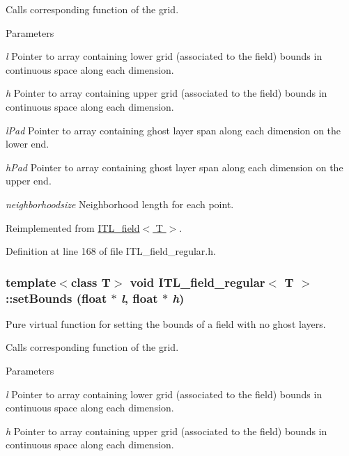 Calls corresponding function of the grid. 
\begin{DoxyParams}{Parameters}
\item[{\em l}]Pointer to array containing lower grid (associated to the field) bounds in continuous space along each dimension. \item[{\em h}]Pointer to array containing upper grid (associated to the field) bounds in continuous space along each dimension. \item[{\em lPad}]Pointer to array containing ghost layer span along each dimension on the lower end. \item[{\em hPad}]Pointer to array containing ghost layer span along each dimension on the upper end. \item[{\em neighborhoodsize}]Neighborhood length for each point. \end{DoxyParams}


Reimplemented from \hyperlink{classITL__field_ab27b49b81f3a7a2a614eaca91cd8eb8c}{ITL\_\-field$<$ T $>$}.



Definition at line 168 of file ITL\_\-field\_\-regular.h.

\hypertarget{classITL__field__regular_a96d8e5cc41ae4e63671d43764056d161}{
\subsubsection[{setBounds}]{\setlength{\rightskip}{0pt plus 5cm}template$<$class T$>$ void {\bf ITL\_\-field\_\-regular}$<$ T $>$::setBounds (float $\ast$ {\em l}, \/  float $\ast$ {\em h})}}
\label{classITL__field__regular_a96d8e5cc41ae4e63671d43764056d161}


Pure virtual function for setting the bounds of a field with no ghost layers. 

Calls corresponding function of the grid. 
\begin{DoxyParams}{Parameters}
\item[{\em l}]Pointer to array containing lower grid (associated to the field) bounds in continuous space along each dimension. \item[{\em h}]Pointer to array containing upper grid (associated to the field) bounds in continuous space along each dimension. \end{DoxyParams}


